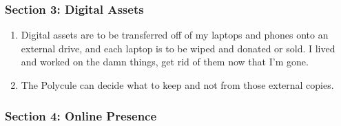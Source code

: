 \hypertarget{section-3-digital-assets}{%
\subsubsection*{Section 3: Digital Assets}\label{section-3-digital-assets}}

\begin{enumerate}
\def\labelenumi{\arabic{enumi}.}
\tightlist
\item
  Digital assets are to be transferred off of my laptops and phones onto an external drive, and each laptop is to be wiped and donated or sold. I lived and worked on the damn things, get rid of them now that I'm gone.
\item
  The Polycule can decide what to keep and not from those external copies.
\end{enumerate}

\hypertarget{section-4-online-presence}{%
\subsubsection*{Section 4: Online Presence}\label{section-4-online-presence}}

